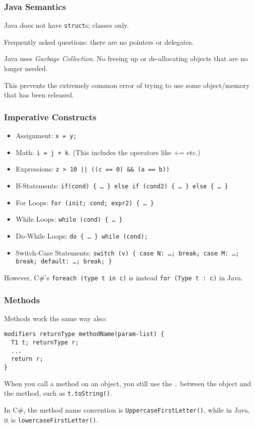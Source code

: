 \begin{frame}
\frametitle{Java Semantics}
\begin{changemargin}{1cm}

Java does not have \texttt{struct}s; classes only. 

Frequently asked questions: there are no pointers or delegates.

Java uses \textit{Garbage Collection}. No freeing up or de-allocating objects that are no longer needed.

This prevents the extremely common error of trying to use some object/memory that has been released.


\end{changemargin}
\end{frame}

\begin{frame}
\frametitle{Imperative Constructs}
\begin{changemargin}{0.25cm}

\begin{itemize}
\item Assignment: {\tt x = y;}
\item Math: {\tt i = j + k}. (This includes the operators like += etc.)
\item Expressions: {\tt z > 10 || ((c == 0) \&\& (a == b))}
\item If-Statements: {\tt if(cond) \{ \ldots~\} else if (cond2) \{ \ldots~\}  else  \{ \ldots~\} }
\item For Loops: {\tt for (init; cond; expr2) \{ \ldots~\} }
\item While Loops: {\tt while (cond) \{ \ldots~\} }
\item Do-While Loops: {\tt do \{ \ldots~\} while (cond); }
\item Switch-Case Statements: {\tt switch (v) \{ case N: \ldots; break; case M: \ldots; break; default: \ldots; break; \} }
\end{itemize}
However, C\#'s {\tt foreach (type t in c)} is instead {\tt for (Type t : c)} in Java.

\end{changemargin}
\end{frame}

\begin{frame}[fragile]
\frametitle{Methods}
\begin{changemargin}{1cm}

Methods work the same way also:
\begin{verbatim}
modifiers returnType methodName(param-list) {
  T1 t; returnType r;
  ...
  return r;
}
\end{verbatim}

When you call a method on an object, you still use the \texttt{.} between the object and the method, such as \texttt{t.toString()}.

In C\#, the method name convention is
{\tt UppercaseFirstLetter()}, while in Java, it is {\tt lowercaseFirstLetter()}.

\end{changemargin}
\end{frame}



